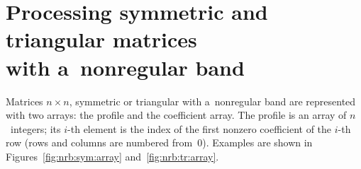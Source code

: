 \vspace{\bigskipamount}


\newpage
\section{\label{sect:nrb:sym:array}Processing symmetric and triangular matrices \\
with a~nonregular band}

Matrices $n\times n$, symmetric or triangular with a~nonregular band
are represented with two arrays: the profile and the coefficient array.
The profile is an array of $n$~integers; its $i$-th element
is the index of the first nonzero coefficient of the $i$-th row
(rows and columns are numbered from~$0$). Examples are shown in
Figures~\ref{fig:nrb:sym:array} and~\ref{fig:nrb:tr:array}.

